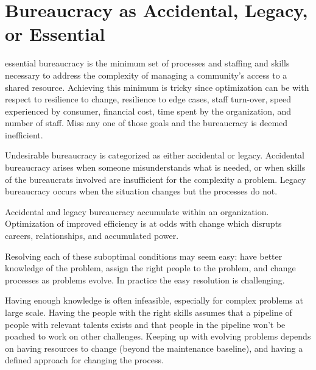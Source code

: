 \section{Bureaucracy as Accidental, Legacy, or Essential}
\gls{essential bureaucracy}
is the minimum set of processes and staffing and skills necessary to address the complexity of managing a community's access to a \gls{shared resource}.
Achieving this minimum is tricky since optimization can be with respect to resilience to change, resilience to edge cases, staff turn-over, speed experienced by consumer, financial cost, time spent by the organization, and number of staff. Miss any one of those goals and the bureaucracy is deemed inefficient.

Undesirable bureaucracy is categorized as either accidental or legacy. Accidental bureaucracy arises when someone misunderstands what is needed, or when skills of the bureaucrats involved are insufficient for the complexity a problem. Legacy bureaucracy occurs when the situation changes but the processes do not. 

Accidental and legacy bureaucracy accumulate within an organization. Optimization of improved efficiency is at odds with change which disrupts careers, relationships, and accumulated power. 

Resolving each of these suboptimal conditions may seem easy: have better knowledge of the problem, assign the right people to the problem, and change processes as problems evolve.  In practice the easy resolution is challenging. 

Having enough knowledge is often infeasible, especially for complex problems at large scale. Having the people with the right skills assumes that a pipeline of people with relevant talents exists and that people in the pipeline won't be poached to work on other challenges. Keeping up with evolving problems depends on having resources to change (beyond the maintenance baseline), and having a defined approach for changing the process. 